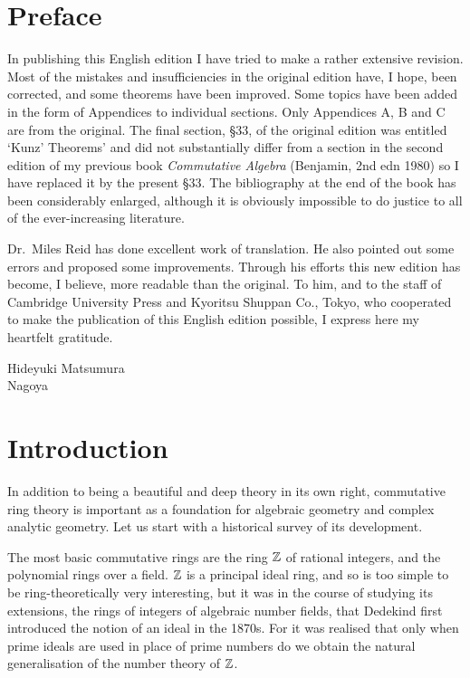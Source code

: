 \chapter*{Preface}

In publishing this English edition I have tried to make a rather extensive
revision. Most of the mistakes and insufficiencies in the original edition
have, I hope, been corrected, and some theorems have been improved.
Some topics have been added in the form of Appendices to individual
sections. Only Appendices A, B and C are from the original. The final
section, \S33, of the original edition was entitled `Kunz' Theorems'
and did not substantially differ from a section in the second edition of
my previous book \textit{Commutative Algebra} (Benjamin, 2nd edn 1980) so I
have replaced it by the present \S33. The bibliography at the end of
the book has been considerably enlarged, although it is obviously
impossible to do justice to all of the ever-increasing literature.

Dr.\ Miles Reid has done excellent work of translation. He also pointed
out some errors and proposed some improvements. Through his efforts this
new edition has become, I believe, more readable than the original. To him,
and to the staff of Cambridge University Press and Kyoritsu Shuppan Co.,
Tokyo, who cooperated to make the publication of this English edition
possible, I express here my heartfelt gratitude.

\begin{flushright}
Hideyuki Matsumura\\
Nagoya
\end{flushright}

\chapter*{Introduction}

In addition to being a beautiful and deep theory in its own right,
commutative ring theory is important as a foundation for algebraic
geometry and complex analytic geometry. Let us start with a historical
survey of its development.

The most basic commutative rings are the ring $\mathbb{Z}$ of rational integers, and
the polynomial rings over a field. $\mathbb{Z}$ is a principal ideal ring, and so is too
simple to be ring-theoretically very interesting, but it was in the course of
studying its extensions, the rings of integers of algebraic number fields, that
Dedekind first introduced the notion of an ideal in the 1870s. For it was
realised that only when prime ideals are used in place of prime numbers do
we obtain the natural generalisation of the number theory of $\mathbb{Z}$.


